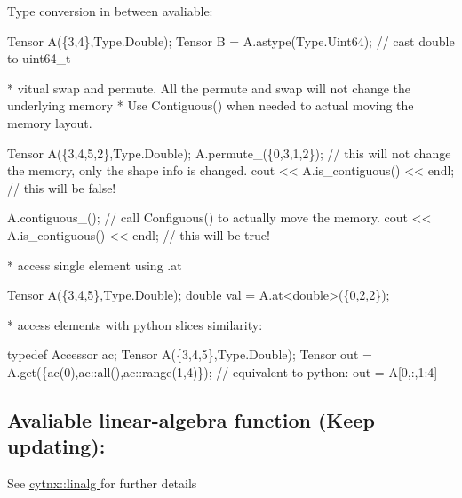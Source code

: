 \begin{DoxyItemize}
\item Type conversion in between avaliable\+: 
\begin{DoxyCode}
Tensor A(\{3,4\},Type.Double);
Tensor B = A.astype(Type.Uint64); \textcolor{comment}{// cast double to uint64\_t}
\end{DoxyCode}
 \begin{DoxyVerb}    * vitual swap and permute. All the permute and swap will not change the underlying memory
    * Use Contiguous() when needed to actual moving the memory layout.
\end{DoxyVerb}
 
\begin{DoxyCode}
Tensor A(\{3,4,5,2\},Type.Double);
A.permute\_(\{0,3,1,2\}); \textcolor{comment}{// this will not change the memory, only the shape info is changed.}
cout << A.is\_contiguous() << endl; \textcolor{comment}{// this will be false!}

A.contiguous\_(); \textcolor{comment}{// call Configuous() to actually move the memory.}
cout << A.is\_contiguous() << endl; \textcolor{comment}{// this will be true!}
\end{DoxyCode}
 \begin{DoxyVerb}    * access single element using .at
\end{DoxyVerb}
 
\begin{DoxyCode}
Tensor A(\{3,4,5\},Type.Double);
\textcolor{keywordtype}{double} val = A.at<\textcolor{keywordtype}{double}>(\{0,2,2\});
\end{DoxyCode}
 \begin{DoxyVerb}    * access elements with python slices similarity:
\end{DoxyVerb}
 
\begin{DoxyCode}
\textcolor{keyword}{typedef} Accessor ac;
Tensor A(\{3,4,5\},Type.Double);
Tensor out = A.get(\{ac(0),ac::all(),ac::range(1,4)\}); 
\textcolor{comment}{// equivalent to python: out = A[0,:,1:4]}
\end{DoxyCode}

\end{DoxyItemize}

\subsection*{Avaliable linear-\/algebra function (Keep updating)\+:}

See \hyperlink{namespacecytnx_1_1linalg}{cytnx\+::linalg } for further details

